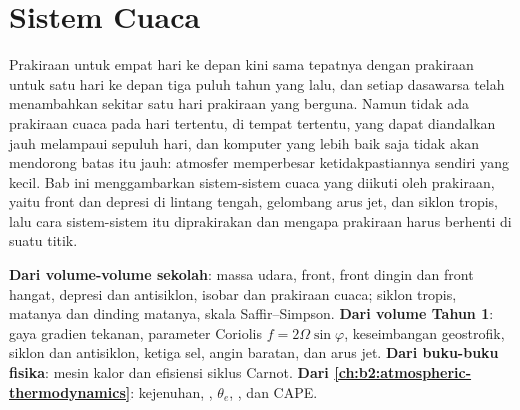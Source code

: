\chapter{Sistem Cuaca}\label{ch:b2:weather-systems}

Prakiraan untuk empat hari ke depan kini sama tepatnya dengan prakiraan untuk satu hari ke depan tiga puluh
tahun yang lalu, dan setiap dasawarsa telah menambahkan sekitar satu hari prakiraan yang berguna. Namun tidak ada prakiraan
cuaca pada hari tertentu, di tempat tertentu, yang dapat diandalkan jauh melampaui sepuluh hari, dan komputer yang lebih baik
saja tidak akan mendorong batas itu jauh: atmosfer memperbesar ketidakpastiannya sendiri yang kecil. Bab
ini menggambarkan sistem-sistem cuaca yang diikuti oleh prakiraan, yaitu front dan depresi di
lintang tengah, gelombang arus jet, dan siklon tropis, lalu cara sistem-sistem itu
diprakirakan dan mengapa prakiraan harus berhenti di suatu titik.

\begin{recall}
\textbf{Dari volume-volume sekolah}: massa udara, front, front dingin dan front hangat, depresi dan
antisiklon, isobar dan prakiraan cuaca; siklon tropis, matanya dan dinding matanya,
skala Saffir--Simpson. \textbf{Dari volume Tahun 1}: gaya gradien tekanan,
parameter Coriolis $f = 2\Omega\sin\varphi$, keseimbangan geostrofik, siklon dan antisiklon,
ketiga sel, angin baratan, dan arus jet. \textbf{Dari buku-buku fisika}: mesin kalor
dan efisiensi siklus Carnot. \textbf{Dari \cref{ch:b2:atmospheric-thermodynamics}}:
kejenuhan, , $\theta_e$, , dan CAPE.
\end{recall}

